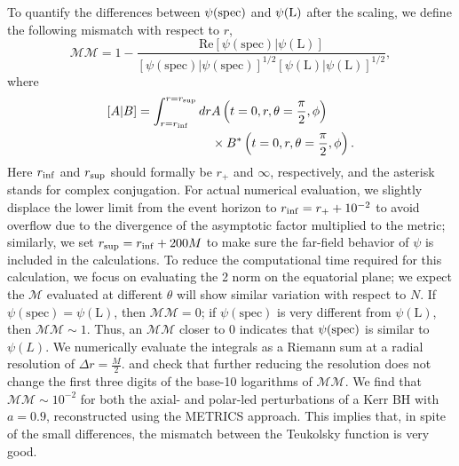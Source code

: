 \documentclass[aps,prx,amsmath,floats,floatfix,twocolumn,
  superscriptaddress,nofootinbib,showpacs]{revtex4-1}
\begin{document}
To quantify the differences between $\psi(\rm spec)$ and $\psi(\rm L)$ after the scaling, we define the following mismatch with respect to $r$, 
\begin{equation}\label{eq:psi4_mm}
\mathcal{MM} = 1 - \frac{\text{Re}[\psi(\text{spec})|\psi(\text{L})]}{[\psi(\text{spec})|\psi(\text{spec})]^{1/2} [\psi(\text{L})|\psi(\text{L})]^{1/2}}, 
\end{equation}
where 
\begin{equation}
\begin{split}
[A|B] = \int_{r=r_{\rm inf}}^{r=r_{\rm sup}} dr & A\left(t = 0, r, \theta = \frac{\pi}{2}, \phi \right) \\
& \times B^{*} \left(t = 0, r, \theta = \frac{\pi}{2}, \phi \right). 
\end{split}
\end{equation}
Here $r_{\rm inf} $ and $r_{\rm sup} $ should formally be $r_+$ and $\infty$, respectively, and the asterisk stands for complex conjugation.
For actual numerical evaluation, we slightly displace the lower limit from the event horizon to $r_{\rm inf} = r_+ + 10^{-2} $ to avoid overflow due to the divergence of the asymptotic factor multiplied to the metric; similarly, we set $r_{\rm sup} = r_{\rm inf} + 200 M $ to make sure the far-field behavior of $\psi$ is included in the calculations. 
To reduce the computational time required for this calculation, we focus on evaluating the 2 norm on the equatorial plane;
we expect the $\mathcal{M}$ evaluated at different $\theta$ will show similar variation with respect to $N$. 
If $\psi(\text{spec}) = \psi(\text{L})$, then $\mathcal{MM} = 0 $; if $\psi(\text{spec})$ is very different from $\psi(\text{L})$, then $\mathcal{MM} \sim 1 $. 
Thus, an $\mathcal{MM} $ closer to 0 indicates that $\psi(\rm spec)$ is similar to $\psi(L)$. 
We numerically evaluate the integrals as a Riemann sum at a radial resolution of $\Delta r = \frac{M}{2}$. 
and check that further reducing the resolution does not change the first three digits of the base-10 logarithms of $\mathcal{MM}$. 
We find that $\mathcal{MM} \sim 10^{-2}$ for both the axial- and polar-led perturbations of a Kerr BH with $a=0.9$, reconstructed using the METRICS approach. This implies that, in spite of the small differences, the mismatch between the Teukolsky function is very good.  
\end{document}
